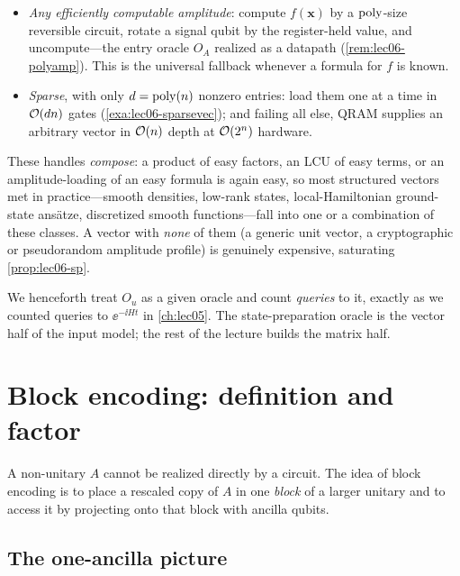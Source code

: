 \begin{remark}
\begin{itemize}[leftmargin=1.4em,nosep]
        integral-transform kernels $1/\lvert\mathbf x\rvert$, $\ee^{-\mu\lvert\mathbf x\rvert}$
        (\cref{exa:lec06-coulomb}).
  \item \emph{Any efficiently computable amplitude}: compute $f(\mathbf x)$ by a
        $\operatorname{poly}$-size reversible circuit, rotate a signal qubit by the register-held
        value, and uncompute---the entry oracle $O_A$ realized as a datapath
        (\cref{rem:lec06-polyamp}). This is the universal fallback whenever a formula
        for $f$ is known.
  \item \emph{Sparse}, with only $d=\operatorname{poly}(n)$ nonzero entries: load them one at a time
        in $\mathcal{O}(dn)$ gates (\cref{exa:lec06-sparsevec}); and failing all else, QRAM
        supplies an arbitrary vector in $\mathcal{O}(n)$ depth at $\mathcal{O}(2^n)$ hardware.
\end{itemize}
These handles \emph{compose}: a product of easy factors, an LCU of easy terms, or an
amplitude-loading of an easy formula is again easy, so most structured vectors met in
practice---smooth densities, low-rank states, local-Hamiltonian ground-state ans\"atze,
discretized smooth functions---fall into one or a combination of these classes. A
vector with \emph{none} of them (a generic unit vector, a cryptographic or
pseudorandom amplitude profile) is genuinely expensive, saturating
\cref{prop:lec06-sp}.
\end{remark}

We henceforth treat $O_u$ as a given oracle and count \emph{queries} to it, exactly
as we counted queries to $\ee^{-\ii Ht}$ in \cref{ch:lec05}. The state-preparation
oracle is the vector half of the input model; the rest of the lecture builds the
matrix half.

\section{Block encoding: definition and factor}
\label{sec:lec06-2}

A non-unitary $A$ cannot be realized directly by a circuit. The idea of block
encoding is to place a rescaled copy of $A$ in one \emph{block} of a larger unitary
and to access it by projecting onto that block with ancilla qubits.

\subsection*{The one-ancilla picture}

